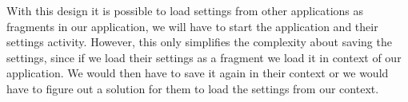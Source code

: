 With this design it is possible to load settings from other applications as fragments in our application, we will have to start the application and their settings activity. However, this only simplifies the complexity about saving the settings, since if we load their settings as a fragment we load it in context of our application. 
We would then have to save it again in their context or we would have to figure out a solution for them to load the settings from our context.

